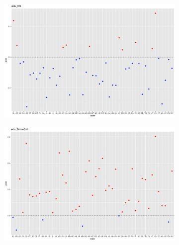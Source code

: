 \documentclass[11pt]{article}
\begin{document}
\begin{figure}

    \centering
    \begin{subfigure}[t]{0.9\textwidth}
        \centering
        \includegraphics[width=\linewidth]{Ex5/figures/2post covariates3.png} 
    \end{subfigure}
    \hfill
    \begin{subfigure}[t]{0.9\textwidth}
        \centering
        \includegraphics[width=\linewidth]{Ex5/figures/2post covariates4.png} 
    \end{subfigure}
\end{figure}
\end{document}
